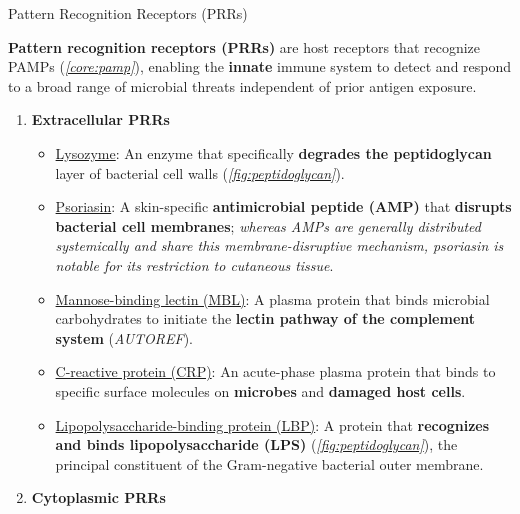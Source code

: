     \begin{core}[label=core:prr]{Pattern Recognition Receptors (PRRs)}

      \textbf{Pattern recognition receptors (PRRs)} are host receptors that recognize PAMPs (\textit{\autoref{core:pamp}}), enabling the \textbf{innate} immune system to detect and respond to a broad range of microbial threats independent of prior antigen exposure.

      \begin{enumerate}

        \item \textbf{Extracellular PRRs}

          \begin{itemize}

            \item \ul{Lysozyme}: An enzyme that specifically \textbf{degrades the peptidoglycan} layer of bacterial cell walls (\textit{\autoref{fig:peptidoglycan}}).

            \item \ul{Psoriasin}: A skin-specific \textbf{antimicrobial peptide (AMP)} that \textbf{disrupts bacterial cell membranes}; \textit{whereas AMPs are generally distributed systemically and share this membrane-disruptive mechanism, psoriasin is notable for its restriction to cutaneous tissue}.

            \item \ul{Mannose-binding lectin (MBL)}: A plasma protein that binds microbial carbohydrates to initiate the \textbf{lectin pathway of the complement system} (\textit{AUTOREF}).

            \item \ul{C-reactive protein (CRP)}: An acute-phase plasma protein that binds to specific surface molecules on \textbf{microbes} and \textbf{damaged host cells}.

            \item \ul{Lipopolysaccharide-binding protein (LBP)}: A protein that \textbf{recognizes and binds lipopolysaccharide (LPS)} (\textit{\autoref{fig:peptidoglycan}}), the principal constituent of the Gram-negative bacterial outer membrane.

          \end{itemize}

        \item \textbf{Cytoplasmic PRRs}

          \begin{itemize}


\end{itemize}
\end{enumerate}
\end{core}
